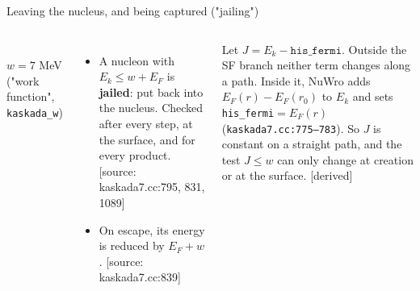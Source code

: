 \documentclass[10pt,aspectratio=169]{beamer}
\newcommand{\code}[1]{{\small\texttt{#1}}}
\newcommand{\tagsrc}[1]{{\scriptsize\color{aBlue}[source: #1]}}
\newcommand{\tagder}{{\scriptsize\color{black!60}[derived]}}
\begin{document}
\begin{frame}{Leaving the nucleus, and being captured ("jailing")}
\small
\begin{columns}[T]
\centering
{}
\\{\scriptsize $w=7$ MeV ("work function", \code{kaskada\_w})}
\begin{itemize}\small
\item A nucleon with $E_k\le w+E_F$ is \textbf{jailed}: put back into the nucleus. Checked after every step, at the surface, and for every product. \tagsrc{kaskada7.cc:795, 831, 1089}
\item On escape, its energy is reduced by $E_F+w$. \tagsrc{kaskada7.cc:839}
\end{itemize}
\begin{derivbox}
Let $J=E_k-\texttt{his\_fermi}$. Outside the SF branch neither term changes along a path. Inside it, NuWro adds $E_F(r)-E_F(r_0)$ to $E_k$ and sets \code{his\_fermi}$=E_F(r)$ (\code{kaskada7.cc:775--783}). So $J$ is constant on a straight path, and the test $J\le w$ can only change at creation or at the surface. \tagder
\end{derivbox}
\end{columns}
\end{frame}
\end{document}
